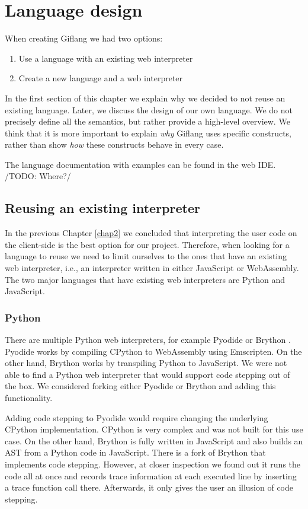 
\chapter{Language design}
\label{chap3:language_design}

When creating Giflang we had two options:
\begin{enumerate}
    \item Use a language with an existing web interpreter
    \item Create a new language and a web interpreter
\end{enumerate}

In the first section of this chapter we explain why we decided to not reuse an existing language. Later, we discuss the design of our own language. We do not
precisely define all the semantics, but rather provide a high-level overview. We think that it is more important to explain \emph{why} Giflang uses specific
constructs, rather than show \emph{how} these constructs behave in every case.

The language documentation with examples can be found in the web IDE. /TODO: Where?/

\section{Reusing an existing interpreter}
In the previous Chapter \ref{chap2} we concluded that interpreting the user code on the client-side is the best option for our project. Therefore, when
looking for a language to reuse we need to limit ourselves to the ones that have an existing web interpreter, i.e., an interpreter written in either
JavaScript or WebAssembly. The two major languages that have existing web interpreters are Python and JavaScript.

\subsection{Python}
There are multiple Python web interpreters, for example Pyodide \cite{Pyodide} or Brython \cite{Brython}. Pyodide works by compiling CPython \cite{CPython}
to WebAssembly using Emscripten. On the other hand, Brython works by transpiling Python to JavaScript. We were not able to find a Python web interpreter that would
support code stepping out of the box. We considered forking either Pyodide or Brython and adding this functionality.

Adding code stepping to Pyodide would require changing the underlying CPython implementation. CPython is very complex and was not built for this use case.
On the other hand, Brython is fully written in JavaScript and also builds an AST from a Python code in JavaScript. There
is a fork of Brython \cite{PythonDebugger} that implements code stepping. However, at closer inspection we found out it runs the code all at once and records trace information
at each executed line by inserting a trace function call there. Afterwards, it only gives the user an illusion of code stepping.

